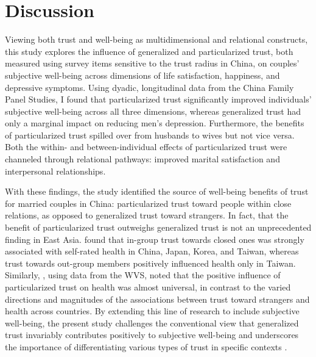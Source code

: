 \section{Discussion}
\label{sec:ch4-discussion}

Viewing both trust and well-being as multidimensional and relational constructs, this study explores the influence of generalized and particularized trust, both measured using survey items sensitive to the trust radius in China, on couples' subjective well-being across dimensions of life satisfaction, happiness, and depressive symptoms. Using dyadic, longitudinal data from the China Family Panel Studies, I found that particularized trust significantly improved individuals' subjective well-being across all three dimensions, whereas generalized trust had only a marginal impact on reducing men's depression. Furthermore, the benefits of particularized trust spilled over from husbands to wives but not vice versa. Both the within- and between-individual effects of particularized trust were channeled through relational pathways: improved marital satisfaction and interpersonal relationships.

With these findings, the study identified the source of well-being benefits of trust for married couples in China: particularized trust toward people within close relations, as opposed to generalized trust toward strangers. In fact, that the benefit of particularized trust outweighs generalized trust is not an unprecedented finding in East Asia. \textcite{sungIngroupTrustSelfrated2020} found that in-group trust towards closed ones was strongly associated with self-rated health in China, Japan, Korea, and Taiwan, whereas trust towards out-group members positively influenced health only in Taiwan. Similarly, \textcite{sungTrustHealthCrossnational2019}, using data from the WVS, noted that the positive influence of particularized trust on health was almost universal, in contrast to the varied directions and magnitudes of the associations between trust toward strangers and health across countries. By extending this line of research to include subjective well-being, the present study challenges the conventional view that generalized trust invariably contributes positively to subjective well-being and underscores the importance of differentiating various types of trust in specific contexts \parencite{delheyHowGeneralTrust2011,nannestadWhatHaveWe2008}.

